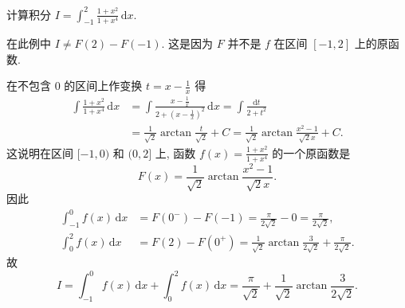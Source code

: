 \documentclass[../../main.tex]{subfiles}
\begin{document}
\begin{example}
计算积分 $I=\int_{-1}^{2}\frac{1+x^{2}}{1+x^{4}}\,\mathrm{d}x$.
\end{example}
\begin{remark}
在此例中 $I\neq F(2)-F(-1)$. 这是因为 $F$ 并不是 $f$ 在区间 $[-1,2]$ 上的原函数.
\end{remark}
\begin{solution}
在不包含 $0$ 的区间上作变换 $t=x-\frac{1}{x}$ 得
\begin{align*}
\int\frac{1+x^{2}}{1+x^{4}}\,\mathrm{d}x&=\int\frac{x-\frac{1}{x}}{2+\left(x-\frac{1}{x}\right)^{2}}\,\mathrm{d}x=\int\frac{\mathrm{d}t}{2+t^{2}}\\
&=\frac{1}{\sqrt{2}}\arctan\frac{t}{\sqrt{2}}+C=\frac{1}{\sqrt{2}}\arctan\frac{x^{2}-1}{\sqrt{2}x}+C.
\end{align*}
这说明在区间 $[-1,0)$ 和 $(0,2]$ 上, 函数 $f(x)=\frac{1+x^{2}}{1+x^{4}}$ 的一个原函数是
$$F(x)=\frac{1}{\sqrt{2}}\arctan\frac{x^{2}-1}{\sqrt{2}x}.$$
因此
\begin{align*}
\int_{-1}^{0}f(x)\,\mathrm{d}x&=F(0^{-})-F(-1)=\frac{\pi}{2\sqrt{2}}-0=\frac{\pi}{2\sqrt{2}},\\
\int_{0}^{2}f(x)\,\mathrm{d}x&=F(2)-F(0^{+})=\frac{1}{\sqrt{2}}\arctan\frac{3}{2\sqrt{2}}+\frac{\pi}{2\sqrt{2}}.
\end{align*}
故
$$I=\int_{-1}^{0}f(x)\,\mathrm{d}x+\int_{0}^{2}f(x)\,\mathrm{d}x=\frac{\pi}{\sqrt{2}}+\frac{1}{\sqrt{2}}\arctan\frac{3}{2\sqrt{2}}.$$
\end{solution}
\end{document}
